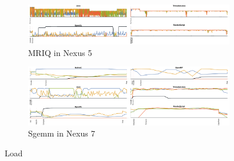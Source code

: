 \begin{figure}[ht]
% 
  \begin{subfigure}[b]{\textwidth}
      \centering
      \includegraphics[width=\textwidth]{data/load_mriq_nexus5.pdf}
      \caption{MRIQ in Nexus 5}
      \label{fig:MRIQ}
  \end{subfigure}

% 

   \begin{subfigure}[b]{\textwidth}
       \centering
       \includegraphics[width=\textwidth]{data/load_sgemm_nexus7.pdf}
       \caption{Sgemm in Nexus 7}\label{fig:Sgemm}
   \end{subfigure}

  \caption{Load}
\end{figure}
\FloatBarrier


